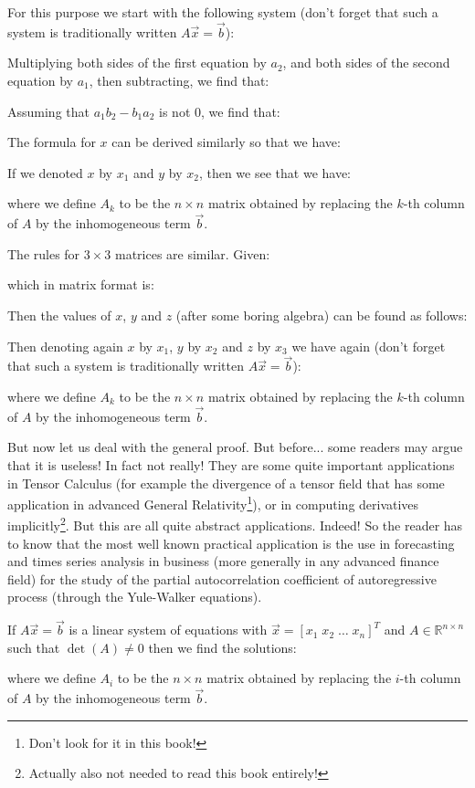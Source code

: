 	For this purpose we start with the following system (don't forget that such a system is traditionally written $A\vec{x}=\vec{b}$):
	
	Multiplying both sides of the first equation by $a_2$, and both sides of the second equation by $a_1$, then subtracting, we find that:
	
	Assuming that $a_1b_2-b_1a_2$ is not $0$, we find that:
	
	The formula for $x$ can be derived similarly so that we have:
	
	If we denoted $x$ by $x_1$ and $y$ by $x_2$, then we see that we have:
	
	where we define $A_k$ to be the $n\times n$ matrix obtained by replacing the $k$-th column of $A$ by the inhomogeneous term $\vec{b}$.
	
	The rules for $3\times 3$ matrices are similar. Given:
	
	which in matrix format is:
	
	Then the values of $x$, $y$ and $z$ (after some boring algebra) can be found as follows:
	
	Then denoting again $x$ by $x_1$, $y$ by $x_2$ and $z$ by $x_3$ we have again (don't forget that such a system is traditionally written $A\vec{x}=\vec{b}$):
	
	where we define $A_k$ to be the $n\times n$ matrix obtained by replacing the $k$-th column of $A$ by the inhomogeneous term $\vec{b}$.
	
	But now let us deal with the general proof. But before... some readers may argue that it is useless! In fact not really! They are some quite important applications in Tensor Calculus (for example the divergence of a tensor field that has some application in advanced General Relativity\footnote{Don't look for it in this book!}), or in computing derivatives implicitly\footnote{Actually also not needed to read this book entirely!}. But this are all quite abstract applications. Indeed! So the reader has to know that the most well known practical application is the use in forecasting and times series analysis in business (more generally in any advanced finance field) for the study of the partial autocorrelation coefficient of autoregressive process (through the Yule-Walker equations).
	
	\begin{theorem}
	If $A\vec{x}=\vec{b}$ is a linear system of equations with $\vec{x}=[x_1\; x_2\; \ldots\; x_n]^T$ and $A\in \mathbb{R}^{n\times n}$ such that $\det(A)\neq 0$ then we find the solutions:
	
	where we define $A_i$ to be the $n\times n$ matrix obtained by replacing the $i$-th column of $A$ by the inhomogeneous term $\vec{b}$.
	\end{theorem}
	
